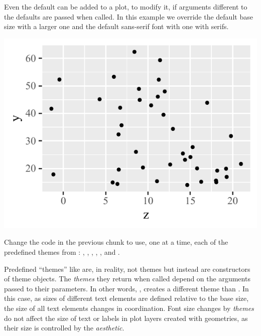 \documentclass[krantz2]{krantz}\usepackage{knitr}
\begin{document}
Even the default  can be added to a plot, to modify it, if arguments different to the defaults are passed when called. In this example we override the default base size with a larger one and the default sans-serif font with one with serifs.

\begin{knitrout}\footnotesize
{}\color{fgcolor}\begin{kframe}
\begin{alltt}
  \hlopt{+}
  \hlstd{()} \hlopt{+}
  \hlstd{(} \hlstd{=} \hlstd{,}
              \hlstd{=} \hlstd{)}
\end{alltt}
\end{kframe}

{\centering \includegraphics[width=.54\textwidth]{figure/pos-themes-01-1}

}



\end{knitrout}

\begin{playground}
Change the code in the previous chunk to use, one at a time, each of the predefined themes from \ggplot: , , , , ,  and .
\end{playground}

\begin{explainbox}
Predefined ``themes'' like  are, in reality, not themes but instead are constructors of theme objects. The \emph{themes} they return when called depend on the arguments passed to their parameters. In other words, , creates a different theme than . In this case, as sizes of different text elements are defined relative to the base size, the size of all text elements changes in coordination. Font size changes by \emph{themes} do not affect the size of text or labels in plot layers created with geometries, as their size is controlled by the  \emph{aesthetic}.
\end{explainbox}
\end{document}
